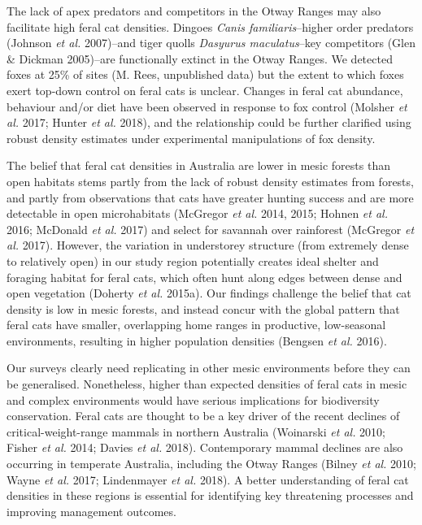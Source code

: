 \documentclass[11pt,a4paper,titlepage,twoside,openright]{style/unimelbthesis}
\begin{document}
\begin{mainmatter}
The lack of apex predators and competitors in the Otway Ranges may also facilitate high feral cat densities. Dingoes \emph{Canis familiaris}--higher order predators (Johnson \emph{et al.} 2007)--and tiger quolls \emph{Dasyurus maculatus}--key competitors (Glen \& Dickman 2005)--are functionally extinct in the Otway Ranges. We detected foxes at 25\% of sites (M. Rees, unpublished data) but the extent to which foxes exert top-down control on feral cats is unclear. Changes in feral cat abundance, behaviour and/or diet have been observed in response to fox control (Molsher \emph{et al.} 2017; Hunter \emph{et al.} 2018), and the relationship could be further clarified using robust density estimates under experimental manipulations of fox density.

The belief that feral cat densities in Australia are lower in mesic forests than open habitats stems partly from the lack of robust density estimates from forests, and partly from observations that cats have greater hunting success and are more detectable in open microhabitats (McGregor \emph{et al.} 2014, 2015; Hohnen \emph{et al.} 2016; McDonald \emph{et al.} 2017) and select for savannah over rainforest (McGregor \emph{et al.} 2017). However, the variation in understorey structure (from extremely dense to relatively open) in our study region potentially creates ideal shelter and foraging habitat for feral cats, which often hunt along edges between dense and open vegetation (Doherty \emph{et al.} 2015a). Our findings challenge the belief that cat density is low in mesic forests, and instead concur with the global pattern that feral cats have smaller, overlapping home ranges in productive, low-seasonal environments, resulting in higher population densities (Bengsen \emph{et al.} 2016).

Our surveys clearly need replicating in other mesic environments before they can be generalised. Nonetheless, higher than expected densities of feral cats in mesic and complex environments would have serious implications for biodiversity conservation. Feral cats are thought to be a key driver of the recent declines of critical-weight-range mammals in northern Australia (Woinarski \emph{et al.} 2010; Fisher \emph{et al.} 2014; Davies \emph{et al.} 2018). Contemporary mammal declines are also occurring in temperate Australia, including the Otway Ranges (Bilney \emph{et al.} 2010; Wayne \emph{et al.} 2017; Lindenmayer \emph{et al.} 2018). A better understanding of feral cat densities in these regions is essential for identifying key threatening processes and improving management outcomes.


\end{mainmatter}
\end{document}
